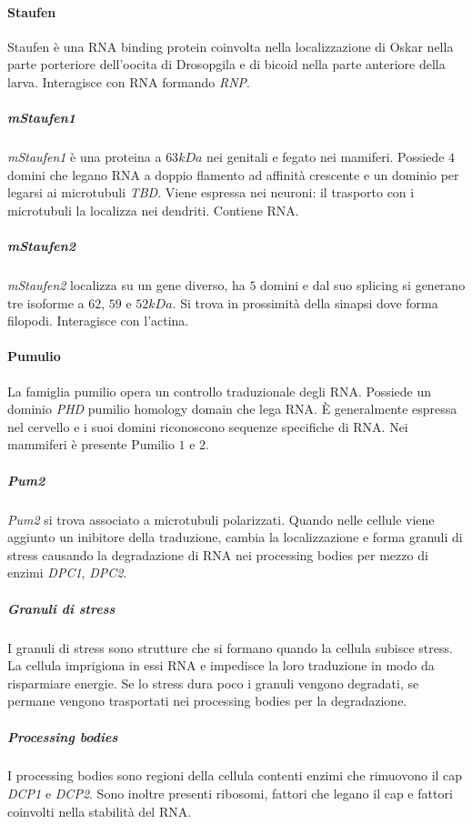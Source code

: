			\paragraph{Staufen}
			Staufen \`e una RNA binding protein coinvolta nella localizzazione di Oskar nella parte porteriore dell'oocita di Drosopgila e di bicoid nella parte anteriore della larva.
			Interagisce con RNA formando \emph{RNP}.

				\subparagraph{\emph{mStaufen1}}
				\emph{mStaufen1} \`e una proteina a $63kDa$ nei genitali e fegato nei mamiferi.
				Possiede $4$ domini che legano RNA a doppio flamento ad affinit\`a crescente e un dominio per legarsi ai microtubuli \emph{TBD}.
				Viene espressa nei neuroni: il trasporto con i microtubuli la localizza nei dendriti.
				Contiene RNA.

				\subparagraph{\emph{mStaufen2}}
				\emph{mStaufen2} localizza su un gene diverso, ha $5$ domini e dal suo splicing si generano tre isoforme a $62$, $59$ e $52kDa$.
				Si trova in prossimit\`a della sinapsi dove forma filopodi.
				Interagisce con l'actina.

			\paragraph{Pumulio}
			La famiglia pumilio opera un controllo traduzionale degli RNA.
			Possiede un dominio \emph{PHD} pumilio homology domain che lega RNA.
			\`E generalmente espressa nel cervello e i suoi domini riconoscono sequenze specifiche di RNA.
			Nei mammiferi \`e presente Pumilio $1$ e $2$.

				\subparagraph{\emph{Pum2}}
				\emph{Pum2} si trova associato a microtubuli polarizzati.
				Quando nelle cellule viene aggiunto un inibitore della traduzione, cambia la localizzazione e forma granuli di stress causando la degradazione di RNA nei processing bodies per mezzo di enzimi \emph{DPC1}, \emph{DPC2}.

				\subparagraph{Granuli di stress}
				I granuli di stress sono strutture che si formano quando la cellula subisce stress.
				La cellula imprigiona in essi RNA e impedisce la loro traduzione in modo da risparmiare energie.
				Se lo stress dura poco i granuli vengono degradati, se permane vengono trasportati nei processing bodies per la degradazione.

				\subparagraph{Processing bodies}
				I processing bodies sono regioni della cellula contenti enzimi che rimuovono il cap \emph{DCP1} e \emph{DCP2}.
				Sono inoltre presenti ribosomi, fattori che legano il cap e fattori coinvolti nella stabilit\`a del RNA.
